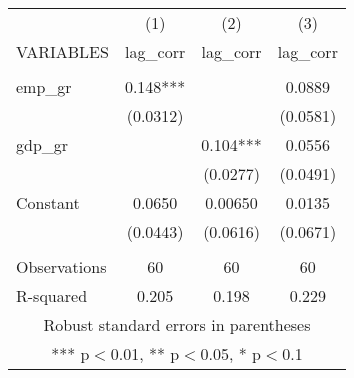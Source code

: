 \documentclass[]{article}
\begin{document}
\begin{tabular}{lccc} \hline
 & (1) & (2) & (3) \\
VARIABLES & lag\_corr & lag\_corr & lag\_corr \\ \hline
 &  &  &  \\
emp\_gr & 0.148*** &  & 0.0889 \\
 & (0.0312) &  & (0.0581) \\
gdp\_gr &  & 0.104*** & 0.0556 \\
 &  & (0.0277) & (0.0491) \\
Constant & 0.0650 & 0.00650 & 0.0135 \\
 & (0.0443) & (0.0616) & (0.0671) \\
 &  &  &  \\
Observations & 60 & 60 & 60 \\
 R-squared & 0.205 & 0.198 & 0.229 \\ \hline
\multicolumn{4}{c}{ Robust standard errors in parentheses} \\
\multicolumn{4}{c}{ *** p$<$0.01, ** p$<$0.05, * p$<$0.1} \\
\end{tabular}
\end{document}
